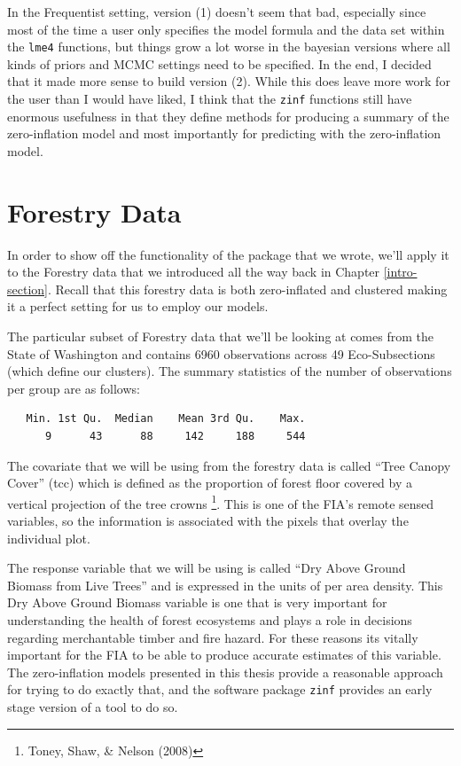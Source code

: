 \documentclass[12pt,twoside]{reedthesis}
\begin{document}
In the Frequentist setting, version (1) doesn't seem that bad, especially since most of the time a user only specifies the model formula and the data set within the \texttt{lme4} functions, but things grow a lot worse in the bayesian versions where all kinds of priors and MCMC settings need to be specified. In the end, I decided that it made more sense to build version (2). While this does leave more work for the user than I would have liked, I think that the \texttt{zinf} functions still have enormous usefulness in that they define methods for producing a summary of the zero-inflation model and most importantly for predicting with the zero-inflation model.

\hypertarget{forestry-data}{%
\section{Forestry Data}\label{forestry-data}}

In order to show off the functionality of the package that we wrote, we'll apply it to the Forestry data that we introduced all the way back in Chapter \ref{intro-section}. Recall that this forestry data is both zero-inflated and clustered making it a perfect setting for us to employ our models.

The particular subset of Forestry data that we'll be looking at comes from the State of Washington and contains 6960 observations across 49 Eco-Subsections (which define our clusters). The summary statistics of the number of observations per group are as follows:
\begin{verbatim}
   Min. 1st Qu.  Median    Mean 3rd Qu.    Max. 
      9      43      88     142     188     544 
\end{verbatim}
The covariate that we will be using from the forestry data is called ``Tree Canopy Cover'' (tcc) which is defined as the proportion of forest floor covered by a vertical projection of the tree crowns \footnote{Toney, Shaw, \& Nelson (2008)}. This is one of the FIA's remote sensed variables, so the information is associated with the pixels that overlay the individual plot.

The response variable that we will be using is called ``Dry Above Ground Biomass from Live Trees'' and is expressed in the units of per area density. This Dry Above Ground Biomass variable is one that is very important for understanding the health of forest ecosystems and plays a role in decisions regarding merchantable timber and fire hazard. For these reasons its vitally important for the FIA to be able to produce accurate estimates of this variable. The zero-inflation models presented in this thesis provide a reasonable approach for trying to do exactly that, and the software package \texttt{zinf} provides an early stage version of a tool to do so.
\end{document}
